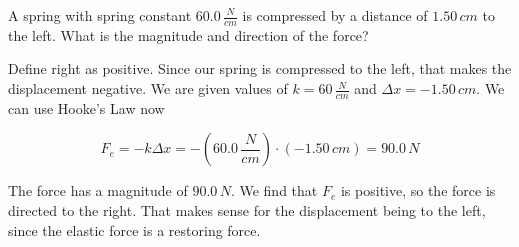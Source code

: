 \documentclass[12pt]{book}
\begin{document}
\begin{exampleblock}

A spring with spring constant $60.0 \, \frac{N}{cm}$ is compressed by a distance of $1.50 \, cm$ to the left. What is the magnitude and direction of the force?

\hspace{10pt}

Define right as positive. Since our spring is compressed to the left, that makes the displacement negative. We are given values of $k = 60 \, \frac{N}{cm}$ and $\Delta x = - 1.50 \, cm$. We can use Hooke's Law  now

\begin{equation}
F_e = -k \Delta x = -(60.0 \, \frac{N}{cm}) \cdot (-1.50 \, cm) = 90.0 \, N
\end{equation}

The force has a magnitude of $90.0 \, N$. We find that $F_e$ is positive, so the force is directed to the right. That makes sense for the displacement being to the left, since the elastic force is a restoring force.

\end{exampleblock}
\end{document}
